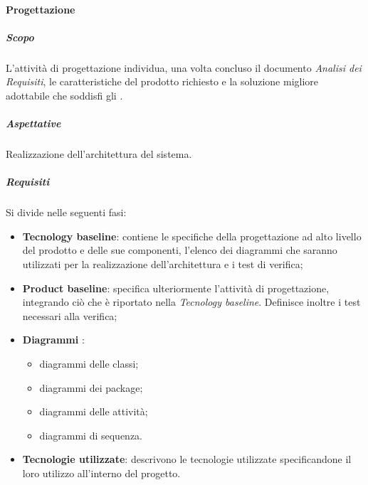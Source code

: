 			\paragraph{Progettazione}	
				\subparagraph{Scopo}
				L'attività di progettazione individua, una volta concluso il documento \textit{Analisi dei Requisiti}, le caratteristiche del prodotto richiesto e la soluzione migliore adottabile che soddisfi gli . 
				\subparagraph{Aspettative}
				Realizzazione dell'architettura del sistema.
				\subparagraph{Requisiti}
				Si divide nelle seguenti fasi:
				\begin{itemize}
					\item \textbf{Tecnology baseline}: contiene le specifiche della progettazione ad alto livello del prodotto e delle sue componenti, l'elenco dei diagrammi  che saranno utilizzati per la realizzazione dell'architettura e i test di verifica;
					\item \textbf{Product baseline}: specifica ulteriormente l'attività di progettazione, integrando ciò che è riportato nella \textit{Tecnology baseline}. Definisce inoltre i test necessari alla verifica;
					\item \textbf{Diagrammi }:
					\begin{itemize}
						\item diagrammi delle classi;
						\item diagrammi dei package;
						\item diagrammi delle attività;
						\item diagrammi di sequenza.
					\end{itemize}
					\item \textbf{Tecnologie utilizzate}: descrivono le tecnologie utilizzate specificandone il loro utilizzo all'interno del progetto.
				\end{itemize}			
